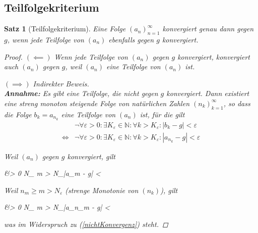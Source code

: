 \documentclass{article}
\newtheorem{thm}{Satz}[section]
\newenvironment{aleq}{
\begin{equation}
\begin{aligned}
}{
\end{aligned}
\end{equation}
}
\newenvironment{aleq*}{\begin{equation*}\begin{aligned}}{\end{aligned}\end{equation*}}
\begin{document}
	\subsection{Teilfolgekriterium}
	\begin{thm}[Teilfolgekriterium]
		Eine Folge \((a_n)_{n=1}^\infty\) konvergiert genau dann gegen \(g\), wenn jede Teilfolge von \((a_n)\) ebenfalls gegen \(g\) konvergiert.
		\begin{proof}
			\((\impliedby)\) Wenn jede Teilfolge von \((a_n)\) gegen \(g\) konvergiert, konvergiert auch \((a_n)\) gegen \(g\), weil \((a_n)\) eine Teilfolge von \((a_n)\) ist. \\
			\par
			\((\implies)\) Indirekter Beweis. \\
				\textbf{Annahme: } Es gibt eine Teilfolge, die nicht gegen \(g\) konvergiert. Dann existiert  eine streng monoton steigende Folge von natürlichen Zahlen \((n_k)_{k=1}^\infty\), so dass die Folge \(b_k = a_{n_k}\) eine Teilfolge von \((a_n)\) ist, für die gilt
			\begin{aleq}
				\label{nichtKonvergenz}
				&\lnot \forall \varepsilon > 0 \colon \exists K_\varepsilon \in \mathbb{N} \colon \forall k > K_\varepsilon \colon |b_k -g| < \varepsilon \\
				\iff &\lnot \forall \varepsilon > 0 \colon \exists K_\varepsilon \in \mathbb{N} \colon \forall k > K_\varepsilon \colon |a_{n_k} -g| < \varepsilon
			\end{aleq}
			\par
			Weil \((a_n)\) gegen \(g\) konvergiert, gilt
			\begin{aleq*}
				&\forall \varepsilon > 0 \colon \exists N_\varepsilon \in {} \colon \forall m > N_\varepsilon \colon |a_m - g| < \varepsilon {}
			\end{aleq*}
			\par
			Weil \(n_m \geq m > N_\varepsilon\) (strenge Monotonie von \((n_k)\)), gilt
			\begin{aleq*}
				&\forall \varepsilon > 0 \colon \exists N_\varepsilon \in {} \colon \forall m > N_\varepsilon \colon |a_{n_m} - g| < \varepsilon \text{,}
			\end{aleq*}
			\par
			was im Widerspruch zu (\ref{nichtKonvergenz}) steht.
 		\end{proof}
	\end{thm}
	
\end{document}
